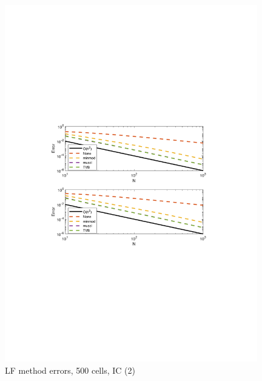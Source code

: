 \documentclass[11pt,a4paper]{article}
\begin{document}
\begin{figure}[!htb]
    \centering
    \includegraphics[width=11cm]{2_1_b_LF_error.pdf}
    \caption{LF method errors, 500 cells, IC (2)}
    \label{fig:LF_IC_1_error}
\end{figure}
\end{document}
